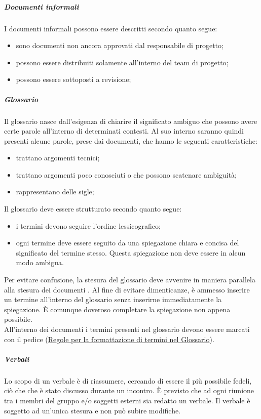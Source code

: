 \documentclass[../NormeProgetto.tex]{subfiles}
\begin{document}
		\subparagraph{Documenti informali}
		I documenti informali possono essere descritti secondo quanto segue:
		\begin{itemize}
			\item sono documenti non ancora approvati dal responsabile di progetto;
			\item possono essere distribuiti solamente all'interno del team di progetto;
			\item possono essere sottoposti a revisione; 
		\end{itemize}
		
		\subparagraph{Glossario} \label{sec:Glossario}
		Il glossario nasce dall'esigenza di chiarire il significato ambiguo che possono avere certe parole all'interno di determinati contesti. Al suo interno saranno quindi presenti alcune parole, prese dai documenti, che hanno le seguenti caratteristiche:
		\begin{itemize}
			\item trattano argomenti tecnici;
			\item trattano argomenti poco conosciuti o che possono scatenare ambiguità;
			\item rappresentano delle sigle;
		\end{itemize}
		Il glossario deve essere strutturato secondo quanto segue:
		\begin{itemize}
			\item i termini devono seguire l'ordine lessicografico;
			\item ogni termine deve essere seguito da una spiegazione chiara e concisa del significato del termine stesso. Questa spiegazione non deve essere in alcun modo ambigua.
		\end{itemize}
		Per evitare confusione, la stesura del glossario deve avvenire in maniera parallela alla stesura dei documenti . Al fine di evitare dimenticanze, è ammesso inserire un termine all'interno del glossario senza inserirne immediatamente la spiegazione. È comunque doveroso completare la spiegazione non appena possibile. \\ All'interno dei documenti i termini presenti nel glossario devono essere marcati con il pedice \g (\hyperref[sec:Formattazione termini nel glossario]{Regole per la formattazione di termini nel Glossario}).
		
		\subparagraph{Verbali}
		Lo scopo di un verbale è di riassumere, cercando di essere il più possibile fedeli, ciò che che è stato discusso durante un incontro. È previsto che ad ogni riunione tra i membri del gruppo e/o soggetti esterni sia redatto un verbale. Il verbale è soggetto ad un'unica stesura e non può subire modifiche.
			
\end{document}
